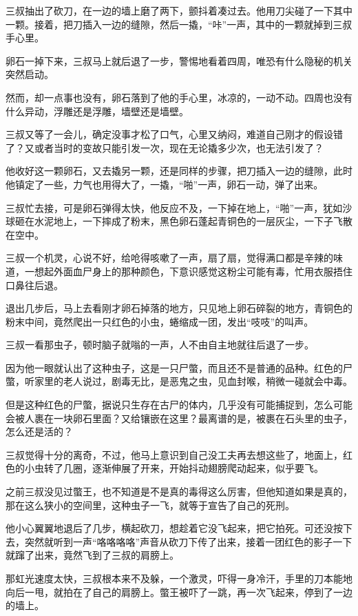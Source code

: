 三叔抽出了砍刀，在一边的墙上磨了两下，颤抖着凑过去。他用刀尖碰了一下其中一颗。接着，把刀插入一边的缝隙，然后一撬，“咔”一声，其中的一颗就掉到三叔手心里。

卵石一掉下来，三叔马上就后退了一步，警惕地看着四周，唯恐有什么隐秘的机关突然启动。

然而，却一点事也没有，卵石落到了他的手心里，冰凉的，一动不动。四周也没有什么异动，浮雕还是浮雕，墙壁还是墙壁。

三叔又等了一会儿，确定没事才松了口气，心里又纳闷，难道自己刚才的假设错了？又或者当时的变故只能引发一次，现在无论撬多少次，也无法引发了？

他收好这一颗卵石，又去撬另一颗，还是同样的步骤，把刀插入一边的缝隙，此时他镇定了一些，力气也用得大了，一撬，“啪”一声，卵石一动，弹了出来。

三叔忙去接，可是卵石弹得太快，他反应不及，一下掉在地上，“啪”一声，犹如沙球砸在水泥地上，一下摔成了粉末，黑色卵石蓬起青铜色的一层灰尘，一下子飞散在空中。

三叔一个机灵，心说不好，给呛得咳嗽了一声，扇了扇，觉得满口都是辛辣的味道，一想起外面血尸身上的那种颜色，下意识感觉这粉尘可能有毒，忙用衣服捂住口鼻往后退。

退出几步后，马上去看刚才卵石掉落的地方，只见地上卵石碎裂的地方，青铜色的粉末中间，竟然爬出一只红色的小虫，蜷缩成一团，发出“吱吱”的叫声。

三叔一看那虫子，顿时脑子就嗡的一声，人不由自主地就往后退了一步。

因为他一眼就认出了这种虫子，这是一只尸蟞，而且还不是普通的品种。红色的尸蟞，听家里的老人说过，剧毒无比，是恶鬼之虫，见血封喉，稍微一碰就会中毒。

但是这种红色的尸蟞，据说只生存在古尸的体内，几乎没有可能捕捉到，怎么可能会被人裹在一块卵石里面？又给镶嵌在这里？最离谱的是，被裹在石头里的虫子，怎么还是活的？

三叔觉得十分的离奇，不过，他马上意识到自己没工夫再去想这些了，地面上，红色的小虫转了几圈，逐渐伸展了开来，开始抖动翅膀爬动起来，似乎要飞。

之前三叔没见过蟞王，也不知道是不是真的毒得这么厉害，但他知道如果是真的，那在这么狭小的空间里，这种虫子一飞，就等于宣告了自己的死刑。

他小心翼翼地退后了几步，横起砍刀，想趁着它没飞起来，把它拍死。可还没按下去，突然就听到一声“咯咯咯咯”声音从砍刀下传了出来，接着一团红色的影子一下就蹿了出来，竟然飞到了三叔的肩膀上。

那虹光速度太快，三叔根本来不及躲，一个激灵，吓得一身冷汗，手里的刀本能地向后一甩，就拍在了自己的肩膀上。蟞王被吓了一跳，再一次飞起来，停到了一边的墙上。

